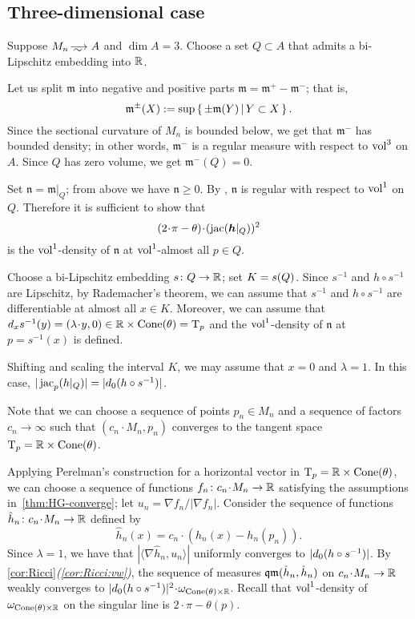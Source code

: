 \subsection{Three-dimensional case}\label{subsec:3d}


Suppose $M_n\smooths{}A$ and $\dim A=3$.
Choose a set $Q\subset A$ that admits a bi-Lipschitz embedding into $\mathbb{R}$. 

Let us split $\mathfrak m$ into negative and positive parts $\mathfrak m=\mathfrak m^+-\mathfrak m^-$; that is,
\[\mathfrak m^\pm(X)\mathrel{{:}{=}}\sup\left\{\,\pm\mathfrak m(Y)\,\middle|\,Y\subset X\,\right\}.\]
Since the sectional curvature of $M_n$ is bounded below, we get that $\mathfrak m^-$ has bounded density; in other words, $\mathfrak m^-$ is a regular measure with respect to $\operatorname{vol}^3$ on $A$.
Since $Q$ has zero volume, we get $\mathfrak m^-(Q)=0$.

Set $\mathfrak n=\mathfrak m|_{Q}$; from above we have $\mathfrak n\ge 0$.
By \cite{petrunin-SC}, $\mathfrak n$ is regular with respect to $\operatorname{vol}^1$ on $Q$.
Therefore it is sufficient to show that 
\[(2\cdot\pi-\theta)\cdot (\jac(\bm{h}|_Q))^2\]
is the $\operatorname{vol}^1$-density of $\mathfrak n$
at $\operatorname{vol}^1$-almost all $p\in Q$.

Choose a bi-Lipschitz embedding $s\colon Q\to \mathbb{R}$;
set $K\zz=s(Q)$.
Since $s^{-1}$ and $h\circ s^{-1}$ are Lipschitz, 
by Rademacher's theorem, we can assume that $s^{-1}$ and $h\circ s^{-1}$ are differentiable at almost all $x\in K$.
Moreover, we can assume that $d_xs^{-1}(y)=(\lambda\cdot y,0)\in \RR\times \Cone(\theta)=\T_p$ and the $\operatorname{vol}^1$-density of $\mathfrak n$ at $p=s^{-1}(x)$ is defined.

Shifting and scaling the interval $K$, we may assume that $x=0$ and $\lambda=1$.
In this case, $|\mathop{\rm jac}_p(h|_Q)|=|d_0(h\circ s^{-1})|$.

Note that we can choose a sequence of points $p_n\in M_n$ and a sequence of factors $c_n\to \infty$ such that $(c_n\cdot M_n,p_n)$ converges to the tangent space~$\mathrm{T}_p=\mathbb{R}\times \operatorname{Cone}(\theta)$.


Applying Perelman's construction \cite[7.1.1 and 7.2.3]{petrunin-conc} for a horizontal vector in $\T_p=\RR\zz\times \Cone(\theta)$,
we can choose a sequence of functions $f_n\:c_n\cdot M_n\to \RR$ satisfying the assumptions in~\ref{thm:HG-converge}; 
let $u_n=\nabla f_n/|\nabla f_n|$.
Consider the sequence of functions $\hat h_n\:c_n\cdot M_n\to \RR$ defined by 
\[\hat h_n(x)=c_n\cdot(h_n(x)-h_n(p_n)).\]
Since $\lambda=1$, we have that $|\langle\nabla \hat h_n,u_n\rangle|$ uniformly converges to $|d_0(h\zz\circ s^{-1})|$.
By \ref{cor:Ricci}\textit{(\ref{cor:Ricci:vw})}, the sequence of measures $\operatorname{\mathfrak{qm}}(\hat h_n, \hat h_n)$ on $c_n\cdot M_n\to \RR$ weakly converges to $|d_0(h\zz\circ s^{-1})|^2\cdot\omega_{\Cone(\theta)\times\RR}$.
Recall that $\operatorname{vol}^1$-density of $\omega_{\operatorname{Cone}(\theta)\times\mathbb{R}}$ on the singular line is $2\cdot \pi-\theta(p)$.

